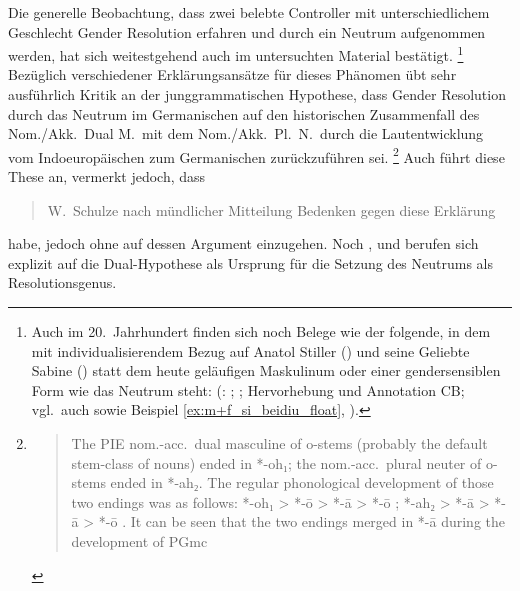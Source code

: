 Die generelle Beobachtung, dass zwei belebte Controller mit unterschiedlichem
Geschlecht Gender Resolution erfahren und durch ein Neutrum aufgenommen werden,
hat sich weitestgehend auch im untersuchten Material bestätigt.%
%
	\footnote{Auch im 20.~Jahrhundert finden sich noch Belege wie der folgende,
		in dem mit individualisierendem Bezug auf Anatol Stiller (\MascM) und
		seine Geliebte Sabine (\FemF) statt dem heute geläufigen Maskulinum
		oder einer gendersensiblen Form wie  das Neutrum steht:
		 (: ; \cite[332--333]{frisch:stiller}; Hervorhebung
		und Annotation CB; vgl.~auch \cite[188]{dal2014} sowie Beispiel
		\ref{ex:m+f_si_beidiu_float}, ).
	}
%
Bezüglich verschiedener Erklärungs\-ansätze für dieses Phänomen übt
\citet[213--221]{askedal1973} sehr ausführlich Kritik an der junggrammatischen
Hypothese, dass Gender Resolution durch das Neutrum im Germanischen auf den
historischen Zusammenfall des Nom./Akk.\ Dual M.\ mit dem Nom./Akk.~Pl.~N.\
durch die Laut\-entwicklung vom Indoeuropäischen zum Germanischen
zurückzuführen sei.%
%
	\footnote{\foreignblockcquote{english}[196]{ringe2017}{The PIE nom.-acc.\
		dual masculine of o-stems (probably the default stem-class of nouns)
		ended in *-oh₁; the nom.-acc.\ plural neuter of o-stems ended in *-ah₂.
		The regular phonological development of those two endings was as
		follows: *-oh₁ > *-ō \textelp{} > *-ā > *-ō \textelp{}; *-ah₂ > *-ā
		\textelp{} > *-ā > *-ō \textelp{}. It can be seen that the two endings
		merged in *-ā during the development of PGmc}.%
	}
%
Auch \citeauthor{behaghel1928} führt diese These an, vermerkt jedoch, dass
\blockcquote[40]{behaghel1928}{W.~Schulze \textelp{} nach mündlicher Mitteilung
Bedenken gegen diese Erklärung} habe, jedoch ohne auf dessen Argument
einzugehen. Noch \citet[157]{hock2008}, \citet[196]{ringe2017} und
\citet[104]{miller2019} berufen sich explizit auf die Dual-Hypothese als
Ursprung für die Setzung des Neutrums als Resolutionsgenus.

